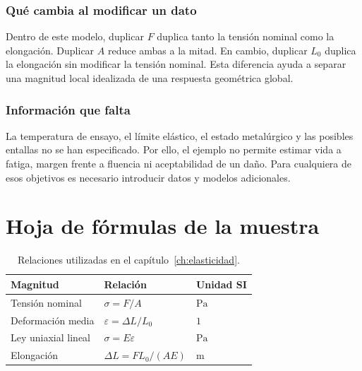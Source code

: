 \subsection{Qué cambia al modificar un dato}
Dentro de este modelo, duplicar $F$ duplica tanto la tensión nominal como la elongación. Duplicar $A$ reduce ambas a la mitad. En cambio, duplicar $L_0$ duplica la elongación sin modificar la tensión nominal. Esta diferencia ayuda a separar una magnitud local idealizada de una respuesta geométrica global.

\subsection{Información que falta}
La temperatura de ensayo, el límite elástico, el estado metalúrgico y las posibles entallas no se han especificado. Por ello, el ejemplo no permite estimar vida a fatiga, margen frente a fluencia ni aceptabilidad de un daño. Para cualquiera de esos objetivos es necesario introducir datos y modelos adicionales.



\appendix
\chapter{Hoja de fórmulas de la muestra}
\label{ap:formulas}
\begin{table}[h]\centering
\caption{Relaciones utilizadas en el capítulo~\ref{ch:elasticidad}.}
\begin{tabular}{lll}\toprule
Magnitud & Relación & Unidad SI\\\midrule
Tensión nominal & $\sigma=F/A$ & $\mathrm{Pa}$\\[7pt]
Deformación media & $\varepsilon=\Delta L/L_0$ & $1$\\[7pt]
Ley uniaxial lineal & $\sigma=E\varepsilon$ & $\mathrm{Pa}$\\[7pt]
Elongación & $\Delta L=FL_0/(AE)$ & $\mathrm{m}$\\\bottomrule
\end{tabular}\end{table}
